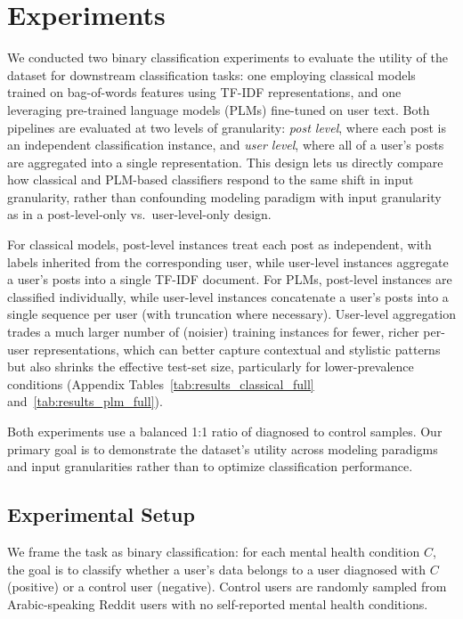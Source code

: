 \documentclass[11pt]{article}
\begin{document}
\section{Experiments}
\label{sec:experiments}

We conducted two binary classification experiments to evaluate the utility of the dataset for downstream classification tasks: one employing classical models trained on bag-of-words features using TF-IDF representations, and one leveraging pre-trained language models (PLMs) fine-tuned on user text. Both pipelines are evaluated at two levels of granularity: \textit{post level}, where each post is an independent classification instance, and \textit{user level}, where all of a user's posts are aggregated into a single representation. This design lets us directly compare how classical and PLM-based classifiers respond to the same shift in input granularity, rather than confounding modeling paradigm with input granularity as in a post-level-only vs.\ user-level-only design.

For classical models, post-level instances treat each post as independent, with labels inherited from the corresponding user, while user-level instances aggregate a user's posts into a single TF-IDF document. For PLMs, post-level instances are classified individually, while user-level instances concatenate a user's posts into a single sequence per user (with truncation where necessary). User-level aggregation trades a much larger number of (noisier) training instances for fewer, richer per-user representations, which can better capture contextual and stylistic patterns but also shrinks the effective test-set size, particularly for lower-prevalence conditions (Appendix Tables~\ref{tab:results_classical_full} and~\ref{tab:results_plm_full}).

Both experiments use a balanced 1:1 ratio of diagnosed to control samples. Our primary goal is to demonstrate the dataset's utility across modeling paradigms and input granularities rather than to optimize classification performance.

\subsection{Experimental Setup}
\label{subsec:setup}

We frame the task as binary classification: for each mental health condition $C$, the goal is to classify whether a user's data belongs to a user diagnosed with $C$ (positive) or a control user (negative). Control users are randomly sampled from Arabic-speaking Reddit users with no self-reported mental health conditions.
\end{document}

